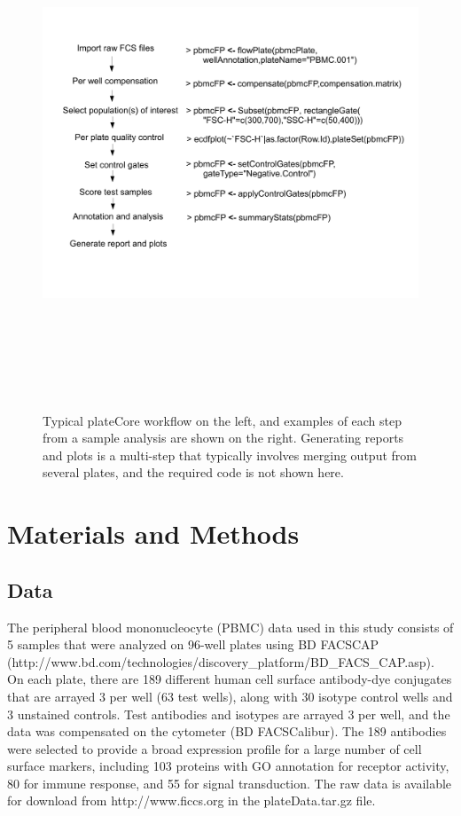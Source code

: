 \documentclass[12pt]{article}
\begin{document}
\begin{figure}
\centering
\includegraphics[width=7in,height=6in]{analysisSteps.pdf}
\caption{Typical plateCore workflow on the left, and examples of each step from a sample analysis are shown on the right.
Generating reports and plots is a multi-step that typically involves merging output from several plates, and the required
code is not shown here.}
\label{fig:analysis}
\end{figure}
 
\clearpage
\section*{Materials and Methods}
\subsection*{Data}

The peripheral blood mononucleocyte (PBMC) data used in this study consists of 5 samples that were analyzed on 96-well plates
using BD FACS\texttrademark CAP (http://www.bd.com/technologies/discovery\_platform/BD\_FACS\_CAP.asp).
On each plate, there are 189 different human cell surface antibody-dye conjugates that
are arrayed 3 per well (63 test wells), along with 30 isotype control wells and 3 unstained controls.
Test antibodies and isotypes are arrayed 3 per well, and the data was compensated
on the cytometer (BD FACSCalibur\texttrademark). The 189 antibodies were selected to provide a broad expression profile
for a large number of cell surface markers, including 103 proteins with GO annotation for receptor activity, 80
for immune response, and 55 for signal transduction. The raw data is available for download from http://www.ficcs.org in the
plateData.tar.gz file. 
\end{document}
